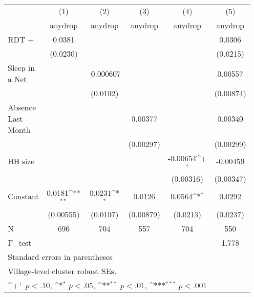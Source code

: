 {
\def\sym#1{\ifmmode^{#1}\else\(^{#1}\)\fi}
\begin{tabular}{l*{5}{c}}
\hline\hline
                    &\multicolumn{1}{c}{(1)}&\multicolumn{1}{c}{(2)}&\multicolumn{1}{c}{(3)}&\multicolumn{1}{c}{(4)}&\multicolumn{1}{c}{(5)}\\
                    &\multicolumn{1}{c}{anydrop}&\multicolumn{1}{c}{anydrop}&\multicolumn{1}{c}{anydrop}&\multicolumn{1}{c}{anydrop}&\multicolumn{1}{c}{anydrop}\\
\hline
RDT +               &      0.0381         &                     &                     &                     &      0.0306         \\
                    &    (0.0230)         &                     &                     &                     &    (0.0215)         \\
[1em]
Sleep in a Net      &                     &   -0.000607         &                     &                     &     0.00557         \\
                    &                     &    (0.0102)         &                     &                     &   (0.00874)         \\
[1em]
Absence Last Month  &                     &                     &     0.00377         &                     &     0.00340         \\
                    &                     &                     &   (0.00297)         &                     &   (0.00299)         \\
[1em]
HH size             &                     &                     &                     &    -0.00654\sym{+}  &    -0.00459         \\
                    &                     &                     &                     &   (0.00316)         &   (0.00347)         \\
[1em]
Constant            &      0.0181\sym{**} &      0.0231\sym{*}  &      0.0126         &      0.0564\sym{*}  &      0.0292         \\
                    &   (0.00555)         &    (0.0107)         &   (0.00879)         &    (0.0213)         &    (0.0237)         \\
\hline
N                   &         696         &         704         &         557         &         704         &         550         \\
F\_test              &                     &                     &                     &                     &       1.778         \\
\hline\hline
\multicolumn{6}{l}{\footnotesize Standard errors in parentheses}\\
\multicolumn{6}{l}{\footnotesize Village-level cluster robust SEs.}\\
\multicolumn{6}{l}{\footnotesize \sym{+} \(p<.10\), \sym{*} \(p<.05\), \sym{**} \(p<.01\), \sym{***} \(p<.001\)}\\
\end{tabular}
}
